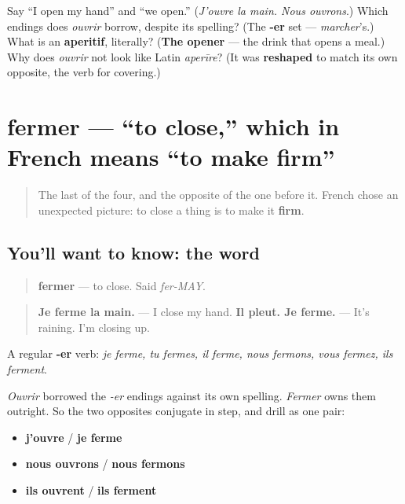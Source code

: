 \begin{tcolorbox}[breakable,colback=teal!4,colframe=teal!35!black,title={Before you move on}]
Say \textquotedblleft{}I open my hand\textquotedblright{} and \textquotedblleft{}we open.\textquotedblright{} (\emph{J'ouvre la main. Nous ouvrons}.) Which endings does \emph{ouvrir} borrow, despite its spelling? (The \textbf{-er} set — \emph{marcher}'s.) What is an \textbf{aperitif}, literally? (\textbf{The opener} — the drink that opens a meal.) Why does \emph{ouvrir} not look like Latin \emph{aperīre}? (It was \textbf{reshaped} to match its own opposite, the verb for covering.)
\end{tcolorbox}
\section[fermer]{fermer — \textquotedblleft{}to close,\textquotedblright{} which in French means \textquotedblleft{}to make firm\textquotedblright{}}

\label{lesson:FR-C27-fermer}



\begin{quote}
The last of the four, and the opposite of the one before it. French chose an unexpected picture: to close a thing is to make it \textbf{firm}.
\end{quote}

\subsection*{You'll want to know: the word}
\begin{quote}
\textbf{fermer} — to close. Said \emph{fer-MAY}.
\end{quote}

\begin{quote}
\textbf{Je ferme la main.} — I close my hand. \textbf{Il pleut. Je ferme.} — It's raining. I'm closing up.
\end{quote}

A regular \textbf{-er} verb: \emph{je ferme, tu fermes, il ferme, nous fermons, vous fermez, ils ferment}.

\begin{grammarlens}[title={Grammar Lens: two opposites, one set of endings}]
\emph{Ouvrir} borrowed the \emph{-er} endings against its own spelling. \emph{Fermer} owns them outright. So the two opposites conjugate in step, and drill as one pair:

\begin{itemize}
\raggedright
  \item \textbf{j'ouvre} / \textbf{je ferme}
  \item \textbf{nous ouvrons} / \textbf{nous fermons}
  \item \textbf{ils ouvrent} / \textbf{ils ferment}
\end{itemize}
\end{grammarlens}


